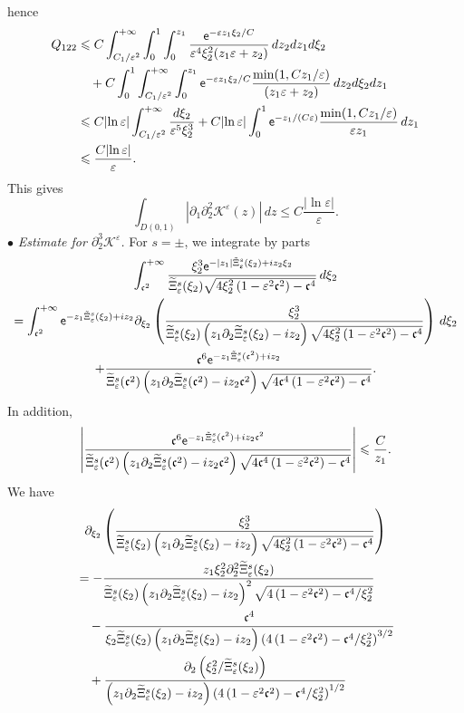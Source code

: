 \documentclass[10pt]{amsart}
\theoremstyle{definition}\newtheorem{defi}[theo]{Definition}\newtheorem{rema}[theo]{Remark}\newtheorem{exam}[theo]{Example}\newtheorem{exem}[theo]{Example}\newtheorem{nota}[theo]{Notation}
\newcommand*\p{\partial}
\newcommand*\BK{\mathcal{K}}
\newcommand*\ex{{\sf e}}
\newcommand*\cs{{\mathfrak c}}
\newcommand*\ii{\infty}
\newcommand*\ls{\leqslant }
\newcommand*\e{\varepsilon}
\newcommand*\lne{\lvert \ln \varepsilon \rvert}
\renewcommand*\t{\tilde}
\let\oldtilde\tilde
\renewcommand*{\tilde}[1]{\mathchoice{\widetilde{#1}}{\widetilde{#1}}{\oldtilde{#1}}{\oldtilde{#1}}}
\begin{document}
hence
\begin{align*}
Q_{122} & \ls C \int_{C_1 / \e^{2}}^{+\ii} \int_0^{1} \int_0^{z_1}
\frac{ \ex^{- \e z_1 \xi_2 /C} }{ \e^4 \xi_2^2 (z_1 \e + z_2) } \, dz_2 dz_1d\xi_2
\\ & \quad + C \int_0^{1} \int_{C_1 / \e^{2}}^{+\ii} \int_0^{z_1} \ex^{- \e z_1 \xi_2 /C} \frac{ \min (1, Cz_1 / \e) }{(z_1 \e + z_2)} \, dz_2 d\xi_2 dz_1
\\ & \ls C \lne \int_{ C_1 / \e^{2}}^{+\ii} \frac{ d\xi_2 }{ \e^5 \xi_2^3 } + C \lne \int_0^{1} \ex^{- z_1 /(C \e)} \frac{ \min (1, Cz_1 / \e) }{ \e z_1 } \, dz_1
\\ &
\ls \frac{C \lne }{\e}.
\end{align*}
This gives
\[
\int_{D(0,1)} \left\lvert \p_1 \p_2^2 \BK^\e (z) \right\rvert \, dz
\ls C \frac{ \lvert \ln \e \rvert }{ \e }.
\]
\noindent $ \bullet $ \emph{Estimate for $ \p_2^3 \BK^\e $.} For $ s = \pm $, we integrate by parts
\begin{multline}\label{IPP_K222_zero}
\int_{ \cs^2}^{+\ii} \frac{ \xi_2^3 \ex^{- |z_1| \t\Xi_\e^s (\xi_2) + i z_2 \xi_2} }{
\t\Xi_\e^s (\xi_2) \sqrt{4 \xi_2^2 \left(1 - \e^2 \cs^2\right) - \cs^4}} \, d\xi_2\\ 
 =
\int_{ \cs^2}^{+\ii} \ex^{- z_1 \t\Xi_\e^s (\xi_2) + i z_2 }
\p_{\xi_2} \left(\frac{ \xi_2^3 }{ \t\Xi_\e^s (\xi_2)\left(z_1 \p_2 \t\Xi_\e^s (\xi_2) - i z_2\right) \sqrt{ 4 \xi_2^2 \left(1 - \e^2 \cs^2\right) - \cs^4}} \right) \, d\xi_2\\ 
+ \frac{ \cs^6 \ex^{- z_1 \t\Xi_\e^s (\cs^2) + i z_2 } }{ \t\Xi_\e^s (\cs^2) \left(z_1 \p_2 \t\Xi_\e^s (\cs^2) - i z_2 \cs^2\right) \sqrt{4 \cs^4 \left(1 - \e^2 \cs^2\right) - \cs^4}}.
\end{multline}
In addition,
\begin{align*}
\left\lvert
\frac{ \cs^6 \ex^{- z_1 \t\Xi_\e^s (\cs^2) + i z_2 \cs^2} }{ \t\Xi_\e^s (\cs^2)\left(z_1 \p_2 \t\Xi_\e^s (\cs^2) - i z_2 \cs^2\right)
\sqrt{ 4 \cs^4 \left(1 - \e^2 \cs^2\right) - \cs^4}} \right\rvert
\ls \frac{C}{z_1}.
\end{align*}
We have
\begin{multline*}
\p_{\xi_2} \left(\frac{ \xi_2^3 }{ \t\Xi_\e^s (\xi_2)\left(z_1 \p_2 \t\Xi_\e^s (\xi_2) - i z_2\right) \sqrt{ 4 \xi_2^2 \left(1 - \e^2 \cs^2\right) - \cs^4}} \right)
\\
\begin{aligned}
 & = - \frac{ z_1 \xi_2^2 \p_2^2 \t\Xi_\e^s (\xi_2) }{ \t\Xi_\e^s (\xi_2) \left(z_1 \p_2 \t\Xi_\e^s (\xi_2) - i z_2\right)^2 \sqrt{4\left(1 - \e^2 \cs^2\right) - \cs^4 / \xi_2^2} }
\\ & \quad - \frac{ \cs^4 }{ \xi_2 \t\Xi_\e^s (\xi_2) \left(z_1 \p_2 \t\Xi_\e^s (\xi_2) - i z_2\right) \left(4 \left(1 - \e^2 \cs^2\right) - \cs^4 /\xi_2^2\right)^{3/2} }
\\ & \quad + \frac{ \p_2 \left(\xi_2^2 / \t\Xi_\e^s (\xi_2)\right) }{\left(z_1 \p_2 \t\Xi_\e^s (\xi_2) - i z_2\right) \left(4 \left(1 - \e^2 \cs^2\right) - \cs^4 /\xi_2^2\right)^{1/2} }
\end{aligned}
\end{multline*}
\end{document}
